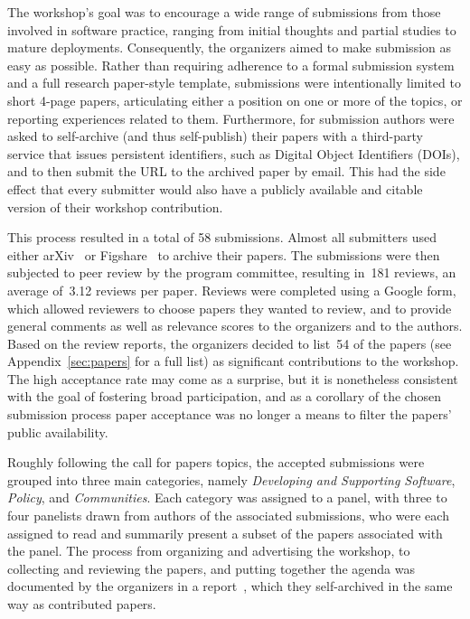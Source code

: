 \documentclass[11pt, oneside]{amsart}
\begin{document}
The workshop's goal was to encourage a wide range of submissions from
those involved in software practice, ranging from initial thoughts and
partial studies to mature deployments. Consequently, the organizers
aimed to make submission as easy as possible. Rather than requiring
adherence to a formal submission system and a full research
paper-style template, submissions were intentionally limited to short
4-page papers, articulating either a position on one or more of the
topics, or reporting experiences related to them. Furthermore, for
submission authors were asked to self-archive (and thus self-publish)
their papers with a third-party service that issues persistent
identifiers, such as Digital Object Identifiers (DOIs), and to then
submit the URL to the archived paper by email. This had the side
effect that every submitter would also have a publicly available and
citable version of their workshop contribution.

This process resulted in a total of 58 submissions. Almost all
submitters used either arXiv~\cite{arXiv-web} or
Figshare~\cite{figshare-web} to archive their papers. The submissions
were then subjected to peer review by the program committee, resulting
in~181 reviews, an average of~3.12 reviews per paper. Reviews were
completed using a Google form, which allowed reviewers to choose
papers they wanted to review, and to provide general comments as well
as relevance scores to the organizers and to the authors. Based on the
review reports, the organizers decided to list~54 of the papers (see
Appendix~\ref{sec:papers} for a full list) as significant
contributions to the workshop. The high acceptance rate may come as a
surprise, but it is nonetheless consistent with the goal of fostering
broad participation, and as a corollary of the chosen submission
process paper acceptance was no longer a means to filter the papers'
public availability.

Roughly following the call for papers topics, the accepted submissions
were grouped into three main
categories, namely \emph{Developing and Supporting Software},
\emph{Policy}, and \emph{Communities}. Each category was assigned to a
panel, with three to four panelists drawn from authors of the
associated submissions, who were each assigned to read and summarily
present a subset of the papers associated with the panel. The process
from organizing and advertising the workshop, to collecting and
reviewing the papers, and putting together the agenda was documented
by the organizers in a report~\cite{WSSSPE1-pre-report}, which they
self-archived in the same way as contributed papers.
\end{document}

